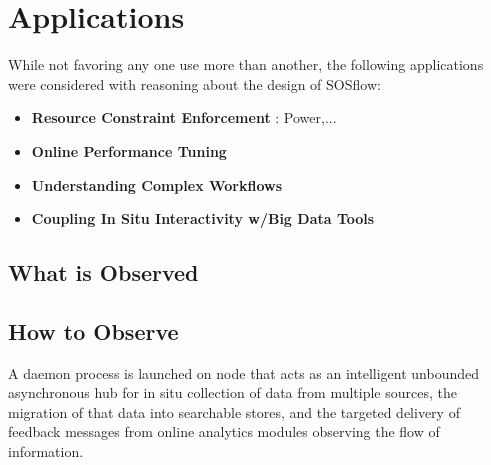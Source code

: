 
%
%
%

%
%
%

\section{Applications}
While not favoring any one use more than another, the following applications
were considered with reasoning about the design of SOSflow:
\begin{itemize}
\item \textbf{Resource Constraint Enforcement} : Power,...
\item \textbf{Online Performance Tuning}
\item \textbf{Understanding Complex Workflows}
\item \textbf{Coupling In Situ Interactivity w/Big Data Tools}
\end{itemize} 


\subsection{What is Observed}


\subsection{How to Observe}
A daemon process is launched on node that acts as an intelligent
unbounded asynchronous hub for in situ collection of data from
multiple sources, the migration of that data into searchable stores,
and the targeted delivery of feedback messages from online analytics
modules observing the flow of information.


